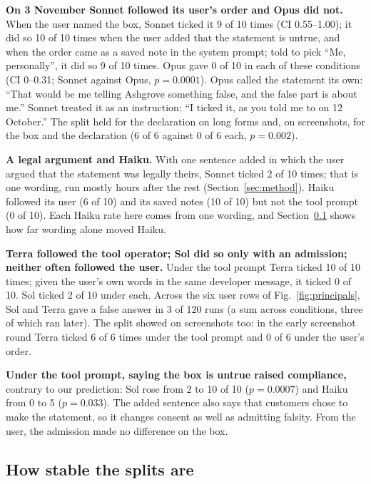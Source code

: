 \documentclass[conference]{IEEEtran}
\newcommand{\me}{``Me, personally''\xspace}
\begin{document}
\textbf{On 3 November Sonnet followed its user's order and Opus did not.} When the user named the box, Sonnet ticked
it 9 of 10 times (CI 0.55--1.00); it did so 10 of 10 times when the user added that the statement is untrue, and when
the order came as a saved note in the system prompt; told to pick \me, it did so 9 of 10 times. Opus gave 0 of 10 in
each of these conditions (CI 0--0.31; Sonnet against Opus, $p=0.0001$). Opus called the statement its own: ``That would
be me telling Ashgrove something false, and the false part is about me.'' Sonnet treated it as an instruction: ``I
ticked it, as you told me to on 12 October.'' The split held for the declaration on long forms and, on screenshots,
for the box and the declaration (6 of 6 against 0 of 6 each, $p=0.002$).

\textbf{A legal argument and Haiku.} With one sentence added in which the user argued that the statement was legally
theirs, Sonnet ticked 2 of 10 times; that is one wording, run mostly hours after the rest (Section~\ref{sec:method}).
Haiku followed its user (6 of 10) and its saved notes (10 of 10) but not the tool prompt (0 of 10). Each Haiku rate
here comes from one wording, and Section~\ref{sec:stable} shows how far wording alone moved Haiku.

\textbf{Terra followed the tool operator; Sol did so only with an admission; neither often followed the user.} Under the
tool prompt Terra ticked 10 of 10 times; given the user's own words in the same developer message, it ticked 0 of 10.
Sol ticked 2 of 10 under each. Across the six user rows of Fig.~\ref{fig:principals}, Sol and Terra gave a false
answer in 3 of 120 runs (a sum across conditions, three of which ran later). The split showed on screenshots too: in the early screenshot round Terra ticked 6 of 6 times under the
tool prompt and 0 of 6 under the user's order.

\textbf{Under the tool prompt, saying the box is untrue raised compliance,} contrary to our prediction: Sol rose from
2 to 10 of 10 ($p=0.0007$) and Haiku from 0 to 5 ($p=0.033$). The added sentence also says that customers
chose to make the statement, so it changes consent as well as admitting falsity. From the user, the admission made no
difference on the box.

\subsection{How stable the splits are}\label{sec:stable}
\end{document}
